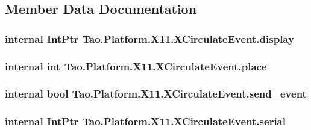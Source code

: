 \subsection{Member Data Documentation}
\hypertarget{struct_tao_1_1_platform_1_1_x11_1_1_x_circulate_event_a552ca78f6f769dd236b6ea37b4414a68}{
\subsubsection[{display}]{\setlength{\rightskip}{0pt plus 5cm}internal IntPtr {\bf Tao.Platform.X11.XCirculateEvent.display}}}
\label{struct_tao_1_1_platform_1_1_x11_1_1_x_circulate_event_a552ca78f6f769dd236b6ea37b4414a68}
\hypertarget{struct_tao_1_1_platform_1_1_x11_1_1_x_circulate_event_a85261f358d9a0d06eb1d12cb3c1519f8}{
\subsubsection[{place}]{\setlength{\rightskip}{0pt plus 5cm}internal int {\bf Tao.Platform.X11.XCirculateEvent.place}}}
\label{struct_tao_1_1_platform_1_1_x11_1_1_x_circulate_event_a85261f358d9a0d06eb1d12cb3c1519f8}
\hypertarget{struct_tao_1_1_platform_1_1_x11_1_1_x_circulate_event_ad9836a0d6942782610aee17ac631f743}{
\subsubsection[{send\_\-event}]{\setlength{\rightskip}{0pt plus 5cm}internal bool {\bf Tao.Platform.X11.XCirculateEvent.send\_\-event}}}
\label{struct_tao_1_1_platform_1_1_x11_1_1_x_circulate_event_ad9836a0d6942782610aee17ac631f743}
\hypertarget{struct_tao_1_1_platform_1_1_x11_1_1_x_circulate_event_a6f3b3f1350d192b03c3af66badefef26}{
\subsubsection[{serial}]{\setlength{\rightskip}{0pt plus 5cm}internal IntPtr {\bf Tao.Platform.X11.XCirculateEvent.serial}}}
